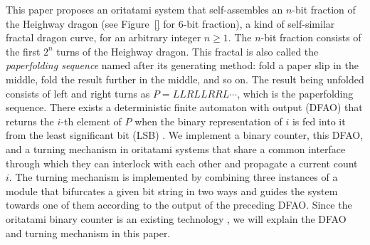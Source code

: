 \documentclass{llncs}
\begin{document}
This paper proposes an oritatami system that self-assembles an $n$-bit fraction of the Heighway dragon (see Figure~\ref{} for 6-bit fraction), a kind of self-similar fractal dragon curve, for an arbitrary integer $n \ge 1$. 
The $n$-bit fraction consists of the first $2^n$ turns of the Heighway dragon. 
This fractal is also called the \textit{paperfolding sequence} named after its generating method: fold a paper slip in the middle, fold the result further in the middle, and so on. 
The result being unfolded consists of left and right turns as $P = LLRLLRRL \cdots$, which is the paperfolding sequence. 
There exists a deterministic finite automaton with output (DFAO) that returns the $i$-th element of $P$ when the binary representation of $i$ is fed into it from the least significant bit (LSB) \cite{AlloucheShallit2003}. 
We implement a binary counter, this DFAO, and a turning mechanism in oritatami systems that share a common interface through which they can interlock with each other and propagate a current count $i$. 
The turning mechanism is implemented by combining three instances of a module that bifurcates a given bit string in two ways and guides the system towards one of them according to the output of the preceding DFAO. 
Since the oritatami binary counter is an existing technology \cite{GeMeScSe2016}, we will explain the DFAO and turning mechanism in this paper. 



\end{document}
